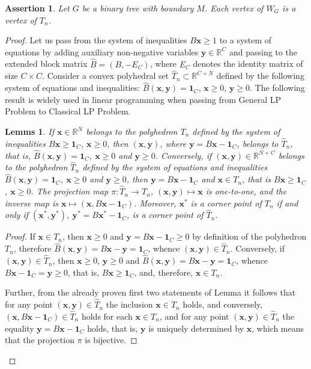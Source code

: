 \documentclass[10pt]{article}
\theoremstyle{plain}
\newtheorem{ass}[thm]{Assertion}
\newtheorem{lem}[thm]{Lemms}
\theoremstyle{definition}
\def\one{\mathbf{1}}
\def\bx{\boldsymbol{x}}
\def\by{\boldsymbol{y}}
\def\:{\colon}
\def\hB{{\widehat{B}}}
\def\hT{{\widehat{T}}}
\newcommand{\R}{{\mathbb R}}
\begin{document}
\begin{ass}\label{ass:vertices}
Let $G$ be a binary tree with boundary $M$. Each vertex of $W_G$ is a vertex of $T_n$.
\end{ass}

\begin{proof}
Let us pass from the system of inequalities $B\bx\ge1$ to a system of equations by adding auxiliary non-negative variables $\by\in\R^C$ and passing to the extended block matrix $\hB=(B,-E_C)$, where $E_C$ denotes the identity matrix of size $C\times C$. Consider a convex polyhedral set $\hT_n\subset\R^{C+N}$ defined by the following system of equations and inequalities: $\hB(\bx,\by)=\one_{C}$, $\bx\ge0$, $\by\ge0$. The following result is widely used in linear programming when passing from General LP Problem to Classical LP Problem.

\begin{lem}\label{lem:clp_glp}
If $\bx\in\R^N$ belongs to the polyhedron $T_n$ defined by the system of inequalities $B\bx\ge\one_C$, $\bx\ge0$, then $(\bx,\by)$, where $\by=B\bx -\one_C$, belongs to $\hT_n$, that is, $\hB(\bx,\by)=\one_C$, $\bx\ge0$ and $\by\ge0$. Conversely, if $(\bx,\by)\in\R^{N+C}$ belongs to the polyhedron $\hT_n$ defined by the system of equations and inequalities $\hB(\bx,\by)=\one_C$, $\bx\ge0$ and $\by\ge0$, then $\by=B\bx -\one_C$ and $\bx\in T_n$, that is $B\bx\ge\one_C$, $\bx\ge0$. The projection map $\pi\:\hT_n\to T_n$, $(\bx,\by)\mapsto\bx$ is one-to-one, and the inverse map is $\bx\mapsto(\bx,B\bx-\one_C)$. Moreover, $\bx^*$ is a corner point of $T_n$ if and only if $(\bx^*,\by^*)$, $\by^*=B\bx^*-\one_C$, is a corner point of $\hT_n$.
\end{lem}

\begin{proof}
If $\bx\in T_n$, then $\bx\ge0$ and $\by=B\bx -\one_C\ge0$ by definition of the polyhedron $T_n$, therefore $\hB(\bx,\by)=B\bx-\by=\one_C$, whence $(\bx,\by)\in\hT_n$. Conversely, if $(\bx,\by)\in\hT_n$, then $\bx\ge0$, $\by\ge0$ and $\hB(\bx,\by)=B\bx-\by=\one_C$, whence $B\bx-\one_C=\by\ge0$, that is, $B\bx\ge\one_C$, and, therefore, $\bx\in T_n$.

Further, from the already proven first two statements of Lemma it follows that for any point $(\bx,\by)\in\hT_n$ the inclusion $\bx\in T_n$ holds, and conversely, $(\bx,B\bx-\one_C)\in\hT_n$ holds for each $\bx\in T_n$, and for any point $(\bx,\by)\in\hT_n$ the equality $\by=B\bx-\one_C$ holds, that is, $\by$ is uniquely determined by $\bx$, which means that the projection $\pi$ is bijective.


\end{proof}
\end{proof}
\end{document}
